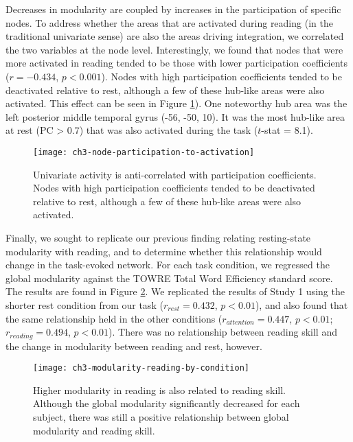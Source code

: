 Decreases in modularity are coupled by increases in the participation of specific nodes. To address whether the areas that are activated during reading (in the traditional univariate sense) are also the areas driving integration, we correlated the two variables at the node level. Interestingly, we found that nodes that were more activated in reading tended to be those with lower participation coefficients ($r = -0.434$, $p < 0.001$). Nodes with high participation coefficients tended to be deactivated relative to rest, although a few of these hub-like areas were also activated. This effect can be seen in Figure \ref{fig:ch3-node-participation-to-activation}). One noteworthy hub area was the left posterior middle temporal gyrus (-56, -50, 10). It was the most hub-like area at rest (PC > 0.7) that was also activated during the task ($t$-stat = 8.1). 

\begin{figure}[t]
	\centering
	\texttt{[image: ch3-node-participation-to-activation]}
    \caption[Univariate activity is anti-correlated with participation coefficients.]{Univariate activity is anti-correlated with participation coefficients. Nodes with high participation coefficients tended to be deactivated relative to rest, although a few of these hub-like areas were also activated.}
	\label{fig:ch3-node-participation-to-activation}
\end{figure}


Finally, we sought to replicate our previous finding relating resting-state modularity with reading, and to determine whether this relationship would change in the task-evoked network. For each task condition, we regressed the global modularity against the TOWRE Total Word Efficiency standard score. The results are found in Figure \ref{fig:ch3-modularity-reading-by-condition}. We replicated the results of Study 1 using the shorter rest condition from our task ($r_{rest} = 0.432$, $p < 0.01$), and also found that the same relationship  held in the other conditions ($r_{attention} = 0.447$, $p < 0.01$; $r_{reading} = 0.494$, $p < 0.01$). There was no relationship between reading skill and the change in modularity between reading and rest, however.  

\begin{figure}[t]
	\centering
	\texttt{[image: ch3-modularity-reading-by-condition]}
    \caption[Higher modularity in reading is also related to reading skill.]{Higher modularity in reading is also related to reading skill. Although the global modularity significantly decreased for each subject, there was still a positive relationship between global modularity and reading skill.}
	\label{fig:ch3-modularity-reading-by-condition}
\end{figure}


